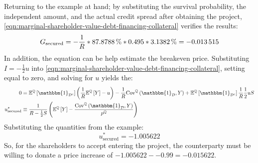\documentclass[../main.tex]{subfiles}
\begin{document}
        Returning to the example at hand;
        by substituting the survival probability, the independent amount, 
        and the actual credit spread after obtaining the project, 
        \cref{eqn:marginal-shareholder-value-debt-financing-collateral} verifies the results:
            \begin{equation}
                G_{\text{secured}}
                =
                - 
                \discountfactor
                *
                \pct{0.878788}
                *
                \num{0.495}
                *
                \pct{0.031382}
                =
                -\num{0.013515}
            \end{equation}
        In addition, the equation can be help estimate the breakeven price.
        Substituting $I=-\frac{1}{2} u$ into 
        \cref{eqn:marginal-shareholder-value-debt-financing-collateral}, 
        setting equal to zero, and solving for $u$ yields the:
            \begin{align}
                0
                &=
                    \mathbb{E}^{\mathbb{Q}}\left[\mathbbm{1}_{\mathcal{D}^{c}}\right] 
                    \left(
                        \discountfactor
                        \mathbb{E}^{\mathbb{Q}}\left[Y\right] 
                        - u
                    \right)
                    -
                    \discountfactor
                    \text{Cov}^{\mathbb{Q}}\left(\mathbbm{1}_{\mathcal{D}}, Y\right) 
                    +
                    \mathbb{E}^{\mathbb{Q}}\left[
                        \mathbbm{1}_{\mathcal{D}^{c}}
                    \right] \discountfactor \frac{1}{2} u S
                    \nonumber \\
                u^{\ast}_{\text{secured}}
                &\equiv
                    \frac{
                        1
                    }{
                        \grossrfrate - \frac{1}{2} S
                    } 
                    \left(
                        \mathbb{E}^{\mathbb{Q}}\left[Y\right]
                        - \frac{
                            \text{Cov}^{\mathbb{Q}}\left(\mathbbm{1}_{\mathcal{D}}, Y\right)
                        }{
                            p^{\mathbb{Q}}  
                        } 
                    \right)
            \end{align}
        Substituting the quantities from the example:
            \begin{equation*}
                u^{\ast}_{\text{secured}}
                =
                \num{-1.005622}
            \end{equation*}    
        So, for the shareholders to accept entering the project,
        the counterparty must be willing to donate a price increase of
        $\num{-1.005622} - \num{-0.99} = \num{-0.015622}$.
        
\end{document}
